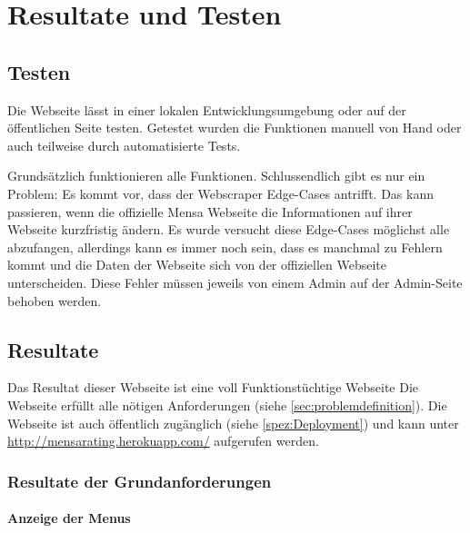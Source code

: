 \chapter{Resultate und Testen} \label{chap:resultate}

\section{Testen} \label{sec:testen}

Die Webseite lässt in einer lokalen Entwicklungsumgebung oder auf der
öffentlichen Seite testen. Getestet wurden die Funktionen manuell von Hand oder
auch teilweise durch automatisierte Tests.

Grundsätzlich funktionieren alle Funktionen. Schlussendlich gibt es nur ein
Problem: Es kommt vor, dass der Webscraper Edge-Cases antrifft. Das kann
passieren, wenn die offizielle Mensa Webseite die Informationen auf ihrer
Webseite kurzfristig ändern. Es wurde versucht diese Edge-Cases möglichst alle
abzufangen, allerdings kann es immer noch sein, dass es manchmal zu Fehlern
kommt und die Daten der Webseite sich von der offiziellen Webseite
unterscheiden. Diese Fehler müssen jeweils von einem Admin auf der Admin-Seite
behoben werden.

\section{Resultate} \label{sec:resultate}

Das Resultat dieser Webseite ist eine voll Funktionstüchtige Webseite
Die Webseite erfüllt alle nötigen Anforderungen (siehe
\ref{sec:problemdefinition}). Die Webseite ist auch öffentlich zugänglich
(siehe \ref{spez:Deployment}) und kann unter
\url{http://mensarating.herokuapp.com/} aufgerufen werden. 
\subsection{Resultate der Grundanforderungen}
 
\newpage

\subsubsection*{Anzeige der Menus}


